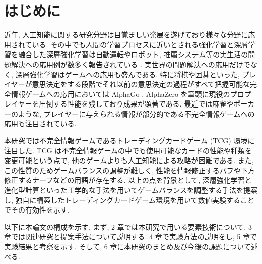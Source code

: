 \newpage
\changeindent{0cm}
\section{はじめに}
\changeindent{2cm}

近年, 人工知能に関する研究分野は目覚ましい発展を遂げており様々な分野に応用されている. その中でも人間の学習プロセスに近いとされる強化学習と深層学習を融合した深層強化学習は自動運転やロボット, 推薦システム等の実生活の問題解決への応用例が数多く報告されている \cite{Vehicle}\cite{robotics}\cite{recommendation}. 
実世界の問題解決への応用だけでなく, 深層強化学習はゲームへの応用も盛んである.
特に将棋や囲碁といった, プレイヤーが意思決定をする段階でそれ以前の意思決定の過程がすべて把握可能な完全情報ゲームへの応用においては AlphaGo \cite{AlphaGo}, AlphaZero \cite{AlphaZero} を筆頭に現役のプロプレイヤーを圧倒する性能を残しており成果が顕著である. 
最近では麻雀やポーカーのような, プレイヤーに与えられる情報が部分的である不完全情報ゲームへの応用も注目されている.
\par
本研究では不完全情報ゲームであるトレーディングカードゲーム (TCG) 環境に注目した. TCG は不完全情報ゲームの中でも使用可能なカードの性能や種類を変更可能という点で, 他のゲームよりも人工知能による攻略が困難である. また, この性質のためゲームバランスの調整が難しく, 性能を情報修正するバフや下方修正するナーフなどの用語が存在する. 以上の点を背景として, 深層強化学習と進化型計算といった工学的な手法を用いてゲームバランスを調整する手法を提案し, 独自に構築したトレーディングカードゲーム環境を用いて数値実験することでその有効性を示す. 
\par
以下に本論文の構成を示す.  まず, 2 章では本研究で用いる要素技術について, 3 章では関連研究と提案手法について説明する. 4 章で実験方法の説明をし, 5 章で実験結果と考察を示す. そして, 6 章に本研究のまとめ及び今後の課題について述べる.